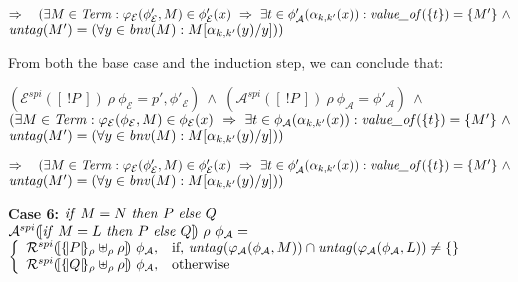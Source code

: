 \documentclass[10pt,a4paper,final,oneside,fleqn]{book}
\begin{document}
\noindent
$\Rightarrow~~~(\exists M\in\mbox{{\itshape Term\/}}:\varphi_\mathcal{E}(\phi'_\mathcal{E},M)\in\phi'_\mathcal{E}(x)~\Rightarrow~\exists t\in\phi'_\mathcal{A}(\alpha_{k,k'}(x)): \mbox{{\itshape value\_of\/}}(\{t\})=\{M'\}~\wedge$\\
$\mbox{{\itshape untag\/}}(M')=(\forall y\in\mbox{{\itshape bnv\/}}(M):M[\alpha_{k,k'}(y)/y]))$\vspace{5mm}

\noindent
From both the base case and the induction step, we can conclude that:

\noindent
$(\mathcal{E}^{spi}(\![~!P~]\!)~\rho~\phi_\mathcal{E}=p',\phi'_\mathcal{E})~\wedge~(\mathcal{A}^{spi}(\![~!P~]\!)~\rho~\phi_\mathcal{A}=\phi'_\mathcal{A})~\wedge$\\
$(\exists M\in\mbox{{\itshape Term\/}}:\varphi_\mathcal{E}(\phi_\mathcal{E},M)\in\phi_\mathcal{E}(x)~\Rightarrow~\exists t\in\phi_\mathcal{A}(\alpha_{k,k'}(x)):\mbox{{\itshape value\_of\/}}(\{t\})=\{M'\}~\wedge$\\
$\mbox{{\itshape untag\/}}(M')=(\forall y\in\mbox{{\itshape bnv\/}}(M):M[\alpha_{k,k'}(y)/y]))$\vspace{5mm}

\noindent
$\Rightarrow~~~(\exists M\in\mbox{{\itshape Term\/}}:\varphi_\mathcal{E}(\phi'_\mathcal{E},M)\in\phi'_\mathcal{E}(x)~\Rightarrow~\exists t\in\phi'_\mathcal{A}(\alpha_{k,k'}(x)): \mbox{{\itshape value\_of\/}}(\{t\})=\{M'\}~\wedge$\\
$\mbox{{\itshape untag\/}}(M')=(\forall y\in\mbox{{\itshape bnv\/}}(M):M[\alpha_{k,k'}(y)/y]))$\vspace{5mm}

\clearpage
\noindent
{\bf Case 6:} $\mbox{{\itshape if\/} }M=N\mbox{ {\itshape then\/} }P\mbox{ {\itshape else\/} }Q$\\
$\mathcal{A}^{spi}(\![\mbox{{\itshape if\/} }M=L\mbox{ {\itshape then\/} }P\mbox{ {\itshape else\/} }Q]\!)~\rho~\phi_\mathcal{A}=$\\
$\left\{\begin{array}{ll}
\mathcal{R}^{spi}(\![\{\!|P|\!\}_\rho\uplus_\rho\rho]\!)~\phi_\mathcal{A},&\mbox{if, }\mbox{{\itshape untag\/}}(\varphi_\mathcal{A}(\phi_\mathcal{A},M))\cap\mbox{{\itshape untag\/}}(\varphi_\mathcal{A}(\phi_\mathcal{A},L))\ne\{\}\\
\mathcal{R}^{spi}(\![\{\!|Q|\!\}_\rho\uplus_\rho\rho]\!)~\phi_\mathcal{A},&\mbox{otherwise}\\
\end{array}\right.$\vspace{5mm}
\end{document}
